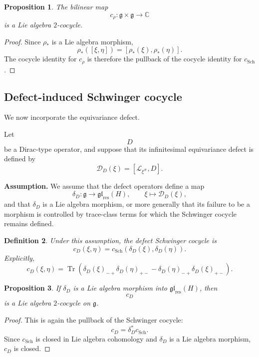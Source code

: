 \documentclass[11pt]{amsart}
\newtheorem{definition}{Definition}[section]
\newtheorem{proposition}[definition]{Proposition}
\begin{document}
\begin{proposition}
The bilinear map
\[
c_\rho:\mathfrak g\times\mathfrak g\to\mathbb C
\]
is a Lie algebra \(2\)-cocycle.
\end{proposition}

\begin{proof}
Since \(\rho_*\) is a Lie algebra morphism,
\[
\rho_*([\xi,\eta])
=
[\rho_*(\xi),\rho_*(\eta)].
\]
The cocycle identity for \(c_\rho\) is therefore the pullback of the cocycle
identity for \(c_{\mathrm{Sch}}\).
\end{proof}

\subsection{Defect-induced Schwinger cocycle}

We now incorporate the equivariance defect.

Let
\[
D
\]
be a Dirac-type operator, and suppose that its infinitesimal equivariance
defect is defined by
\[
\mathcal D_D(\xi)
=
[\mathcal L_{\xi^\#},D].
\]

\textbf{Assumption.}
We assume that the defect operators define a map
\[
\delta_D:\mathfrak g\longrightarrow \mathfrak{gl}_{\mathrm{res}}(H),
\qquad
\xi\mapsto \mathcal D_D(\xi),
\]
and that \(\delta_D\) is a Lie algebra morphism, or more generally that its
failure to be a morphism is controlled by trace-class terms for which the
Schwinger cocycle remains defined.


\begin{definition}
Under this assumption, the \emph{defect Schwinger cocycle} is
\[
c_D(\xi,\eta)
=
c_{\mathrm{Sch}}(\delta_D(\xi),\delta_D(\eta)).
\]
Explicitly,
\[
c_D(\xi,\eta)
=
\operatorname{Tr}
\left(
\delta_D(\xi)_{-+}\delta_D(\eta)_{+-}
-
\delta_D(\eta)_{-+}\delta_D(\xi)_{+-}
\right).
\]
\end{definition}

\begin{proposition}
If \(\delta_D\) is a Lie algebra morphism into
\(\mathfrak{gl}_{\mathrm{res}}(H)\), then
\[
c_D
\]
is a Lie algebra \(2\)-cocycle on \(\mathfrak g\).
\end{proposition}

\begin{proof}
This is again the pullback of the Schwinger cocycle:
\[
c_D=\delta_D^*c_{\mathrm{Sch}}.
\]
Since \(c_{\mathrm{Sch}}\) is closed in Lie algebra cohomology and
\(\delta_D\) is a Lie algebra morphism, \(c_D\) is closed.
\end{proof}
\end{document}
